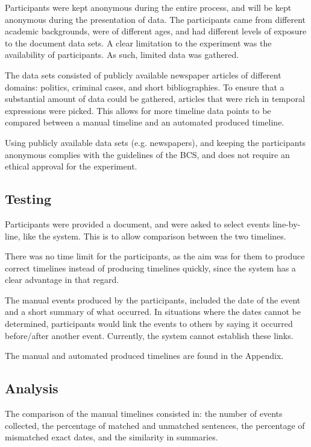 \par Participants were kept anonymous during the entire process, and will be kept anonymous during the presentation of data. The participants came from different academic backgrounds, were of different ages, and had different levels of exposure to the document data sets. A clear limitation to the experiment was the availability of participants. As such, limited data was gathered.
 
\par The data sets consisted of publicly available newspaper articles of different domains: politics, criminal cases, and short bibliographies. To ensure that a substantial amount of data could be gathered, articles that were rich in temporal expressions were picked. This allows for more timeline data points to be compared between a manual timeline and an automated produced timeline.

\par Using publicly available data sets (e.g. newspapers), and keeping the participants anonymous complies with the guidelines of the BCS, and does not require an ethical approval for the experiment.

\subsection{Testing}
\par Participants were provided a document, and were asked to select events line-by-line, like the system. This is to allow comparison between the two timelines. 

\par There was no time limit for the participants, as the aim was for them to produce correct timelines instead of producing timelines quickly, since the system has a clear advantage in that regard.

\par The manual events produced by the participants, included the date of the event and a short summary of what occurred. In situations where the dates cannot be determined, participants would link the events to others by saying it occurred before/after another event. Currently, the system cannot establish these links.

\par The manual and automated produced timelines are found in the Appendix.

\subsection{Analysis}
\par The comparison of the manual timelines consisted in: the number of events collected, the percentage of matched and unmatched sentences, the percentage of mismatched exact dates, and the similarity in summaries. 

